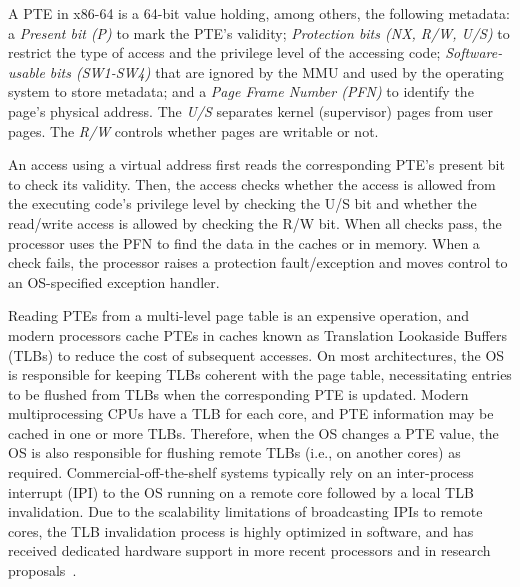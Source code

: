 A PTE in x86-64 is a 64-bit value holding, among others, the following metadata:
a \emph{Present bit (P)} to mark the PTE's validity;
\emph{Protection bits (NX, R/W, U/S)} to restrict the type of
access and the privilege level of the accessing code;
\emph{Software-usable bits (SW1-SW4)} that are ignored by the MMU and used by 
the operating system to store metadata; and
a \emph{Page Frame Number (PFN)} to identify the page's physical address.
The \emph{U/S} separates kernel (supervisor) pages from user pages.
The \emph{R/W} controls whether pages are writable or not.

An access using a virtual address first reads the corresponding PTE's
present bit to check its validity.
Then, the access checks whether the access is allowed from the executing
code's privilege level by checking the U/S bit and whether the
read/write access is allowed by checking the R/W bit.
When all checks pass, the processor uses the PFN to find the data in
the caches or in memory.
When a check fails, the processor raises a protection fault/exception and
moves control to an OS-specified exception handler.

Reading PTEs from a multi-level page table is an expensive operation, and
modern processors cache PTEs in caches known as Translation Lookaside
Buffers (TLBs) to reduce the cost of subsequent accesses.
On most architectures, the OS is responsible for keeping TLBs coherent with
the page table, necessitating entries to be flushed from TLBs when the
corresponding PTE is updated.
Modern multiprocessing CPUs have a TLB for each core, and PTE information
may be cached in one or more TLBs.
Therefore, when the OS changes a PTE value, the OS is also responsible for
flushing remote TLBs (i.e., on another cores) as required.
Commercial-off-the-shelf systems typically rely on an inter-process 
interrupt (IPI) to the OS running on a remote core followed by a local TLB 
invalidation.
Due to the scalability limitations of broadcasting IPIs to remote cores, 
the TLB invalidation process is highly optimized in software, and has
received dedicated hardware support in more recent processors and in research
proposals~\cite{RomanescuLSB10, VillaviejaKVERMNCU11, YanVCB17}.

